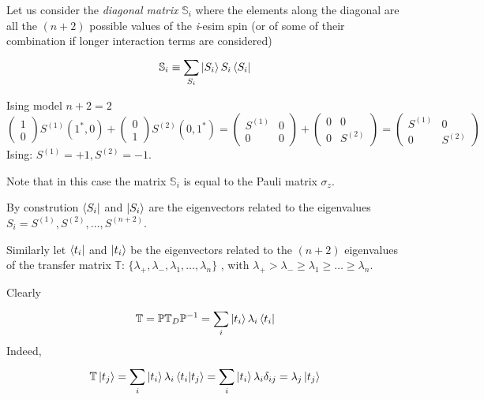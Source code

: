 \documentclass[../main/main.tex]{subfiles}
\begin{document}
Let us consider  the \emph{diagonal matrix} \( \mathbb{S}_i \) where the elements along the diagonal are all the  \( (n+2) \) possible values of the \emph{i}-esim spin (or of some of their combination if longer interaction terms are considered)
\begin{equation}
  \mathbb{S}_i \equiv  \sum_{S_i}^{} \ket{S_i} S_i \bra{S_i}
\end{equation}
\begin{example}{}{}
Ising model \( n+2=2 \)
\begin{equation*}
  \begin{pmatrix}
  1 \\
  0
  \end{pmatrix} S^{(1)} (1^*,0) +
  \begin{pmatrix}
  0 \\
  1
  \end{pmatrix} S^{(2)} (0,1^*) =
  \begin{pmatrix}
  S^{(1)}   & 0 \\
  0   & 0
  \end{pmatrix}
  +
  \begin{pmatrix}
  0   & 0 \\
  0   & S^{(2)}
  \end{pmatrix}
  =
  \begin{pmatrix}
  S^{(1)}  & 0 \\
  0   & S^{(2)}
  \end{pmatrix}
\end{equation*}
Ising: \( S^{(1)} =+1,S^{(2)}=-1 \).
\begin{remark}
Note that in this case the matrix \( \mathbb{S}_i \) is equal to the Pauli matrix \( \sigma _z \).
\end{remark}
\end{example}
\begin{remark}
By constrution \( \bra{S_i}  \) and \( \ket{S_i}  \) are the eigenvectors related to the eigenvalues \( S_i = S^{(1)},S^{(2)}, \dots,S^{(n+2)} \).
\end{remark}
Similarly let \( \bra{t_i}  \) and \( \ket{t_i}  \) be the eigenvectors related to the \( (n+2) \) eigenvalues of the transfer matrix \( \mathbb{T} \):
   \( \{ \lambda _+,\lambda _-,\lambda _1,\dots,\lambda _n  \}   \) , with \( \lambda _+ > \lambda _- \ge \lambda _1 \ge \dots \ge \lambda _n \).

Clearly
\begin{equation}
  \mathbb{T} = \mathbb{P} \mathbb{T}_D \mathbb{P}^{-1} = \sum_{i}^{} \ket{t_i} \lambda _i \bra{t_i}
\end{equation}
Indeed,
\begin{equation}
  \mathbb{T} \ket{t_j} = \sum_{i}^{} \ket{t_i} \lambda _i \braket{t_i}{t_j} = \sum_{i}^{}  \ket{t_i} \lambda _i \delta _{ij} = \lambda _j \ket{t_j}
\end{equation}
\end{document}
